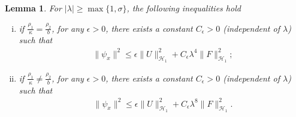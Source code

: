 \documentclass[11pt,reqno]{article}
\newtheorem{lemma}[theorem]{Lemma}
\begin{document}
  \begin{lemma}\label{lemma-psix}
  	For $|\lambda| \geq \max\{1, \sigma\}$, the following inequalities hold
  	\begin{enumerate}[(i)]
  		\item if $\frac{\rho_1}{\kappa}=\frac{\rho_2}{b}$, for any $\epsilon>0$, there exists a constant $C_{\epsilon}>0$ (independent of $\lambda$) such that
  		\begin{align}
  			\|\psi_x\|^2 \leq \epsilon\|U\|_{\mathcal{H}_1}^2 + C_{\epsilon} \lambda ^4 \|F\|_{\mathcal{H}_1}^2;
  		\end{align}
  		\item if $\frac{\rho_1}{\kappa} \neq \frac{\rho_2}{b}$, for any $\epsilon>0$, there exists a constant $C_{\epsilon}>0$ (independent of $\lambda$) such that
  		\begin{align}
  			\|\psi_x\|^2 \leq \epsilon\|U\|_{\mathcal{H}_1}^2 + C_{\epsilon}\lambda ^8\|F\|_{\mathcal{H}_1}^2.
  		\end{align}
  	\end{enumerate}
  \end{lemma}
\end{document}
